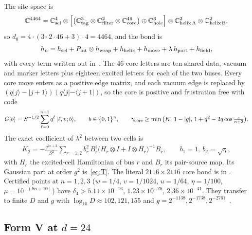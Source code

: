 \documentclass[11pt]{article}
\theoremstyle{definition}
\newcommand{\C}{\mathbb{C}}
\newcommand{\ket}[1]{|#1\rangle}
\newcommand{\bra}[1]{\langle #1|}
\begin{document}
The site space is
\begin{align}
\C^{4464}=\C^4_{\rm sel}\otimes\Big[\big(\C^3_{\rm tag}\otimes\C^2_{\rm filter}\otimes\C^{46}_{\rm core}\big)\oplus\C^3_{\rm hole}\Big]\otimes\C^2_{\rm helix\,A}\otimes\C^2_{\rm helix\,B},
\label{eq:site}
\end{align}
so $d_0=4\cdot(3\cdot2\cdot46+3)\cdot4=4464$, and the bond is
\begin{align}
h_n=h_{\rm sel}+P_{\rm int}\otimes h_{\rm wrap}+h_{\rm helix}+h_{\rm move}+\lambda\,h_{\rm port}+h_{\rm field},
\label{eq:hn}
\end{align}
with every term written out in~\cite[\S2]{routeAfinal}. The 46 core letters are ten shared data, vacuum and marker letters plus eighteen excited letters for each of the two buses. Every core move enters as a positive edge matrix, and each vacuum edge is replaced by $(q\ket{j}-\ket{j+1})(q\bra{j}-\bra{j+1})$, so the core is positive and frustration free with code
\begin{align}
G\ket{b}=S^{-1/2}\sum_{\ell=0}^{n+1}q^{\ell}\,\ket{\ell,v;b},\qquad b\in\{0,1\}^n,\qquad
\gamma_{\rm core}\ge\min\big(K,\,1-|g|,\,1+q^2-2q\cos\tfrac{\pi}{n+2}\big).
\label{eq:code}
\end{align}
The exact coefficient of $\lambda^2$ between two cells is~\cite{C39}
\begin{align}
K_2=-\frac{q^{2n+2}}{S^2}\sum_{r=1,2}b_r^2\,B_r^\dagger\big(H_r\otimes I+I\otimes H_r\big)^{-1}B_r,\qquad b_1=1,\ b_2=\sqrt\eta,
\label{eq:K2}
\end{align}
with $H_r$ the excited-cell Hamiltonian of bus $r$ and $B_r$ its pair-source map. Its Gaussian part at order $g^2$ is~\eqref{eq:T}. The literal $2116\times2116$ core bond is in . Certified points at $n=1,2,3$ ($w=1/4$, $v=1/1024$, $u=1/64$, $\eta=1/100$, $\mu=10^{-(8n+10)}$) have $\delta_4>5.11\times10^{-16}$, $1.23\times10^{-28}$, $2.36\times10^{-41}$. They transfer to finite $D$ and $g$ with $\log_{10}D\approx102,121,155$ and $g=2^{-1138},2^{-1738},2^{-2761}$~\cite{C42}.

\subsection{Form V at \texorpdfstring{$d=24$}{d=24}}
\label{sec:V}
\end{document}
